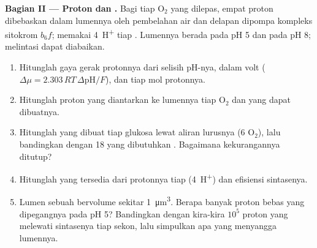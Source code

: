 \begin{problem}
\medskip
\noindent\textbf{Bagian II --- Proton dan .}
Bagi tiap $\mathrm{O_2}$ yang dilepas, empat proton dibebaskan dalam
lumennya oleh pembelahan air dan delapan dipompa kompleks sitokrom
$b_6f$;  memakai \qty{4}{H^+} tiap . Lumennya berada pada
pH 5 dan  pada pH 8;  melintasi 
dapat diabaikan.
\begin{enumerate}[resume]
  \item Hitunglah gaya gerak protonnya dari selisih pH-nya, dalam volt
        ($\Delta\mu = 2.303\,RT\,\Delta\mathrm{pH}/F$), dan 
        tiap mol protonnya.
  \item Hitunglah proton yang diantarkan ke lumennya tiap
        $\mathrm{O_2}$ dan  yang dapat dibuatnya.
  \item Hitunglah  yang dibuat tiap glukosa lewat aliran lurusnya (6
        $\mathrm{O_2}$), lalu bandingkan dengan 18 yang dibutuhkan . Bagaimana kekurangannya ditutup?
  \item Hitunglah  yang tersedia dari protonnya tiap 
        (\qty{4}{H^+}) dan efisiensi sintasenya.
  \item Lumen sebuah  bervolume sekitar \qty{1}{\micro m^3}.
        Berapa banyak proton bebas yang dipegangnya pada pH 5?
        Bandingkan dengan kira-kira $10^5$ proton yang melewati
        sintasenya tiap sekon, lalu simpulkan apa yang menyangga
        lumennya.
\end{enumerate}


\end{problem}
